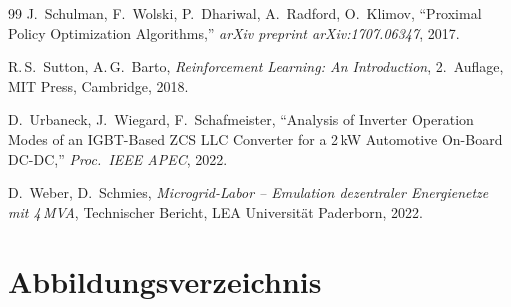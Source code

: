 ﻿\documentclass[a4paper,12pt,openany,oneside]{book}
\theoremstyle{definition}
\begin{document}
\begin{thebibliography}{99}
J.~Schulman, F.~Wolski, P.~Dhariwal, A.~Radford, O.~Klimov,
``Proximal Policy Optimization Algorithms,''
\emph{arXiv preprint arXiv:1707.06347}, 2017.

R.\,S.~Sutton, A.\,G.~Barto,
\emph{Reinforcement Learning: An Introduction},
2.~Auflage, MIT Press, Cambridge, 2018.

D.~Urbaneck, J.~Wiegard, F.~Schafmeister,
``Analysis of Inverter Operation Modes of an IGBT-Based ZCS LLC Converter
for a 2\,kW Automotive On-Board DC-DC,''
\emph{Proc.\ IEEE APEC}, 2022.

D.~Weber, D.~Schmies,
\emph{Microgrid-Labor -- Emulation dezentraler Energienetze mit 4\,MVA},
Technischer Bericht, LEA Universit\"at Paderborn, 2022.

\end{thebibliography}


\chapter{Abbildungsverzeichnis}
\listoffigures
\end{document}
